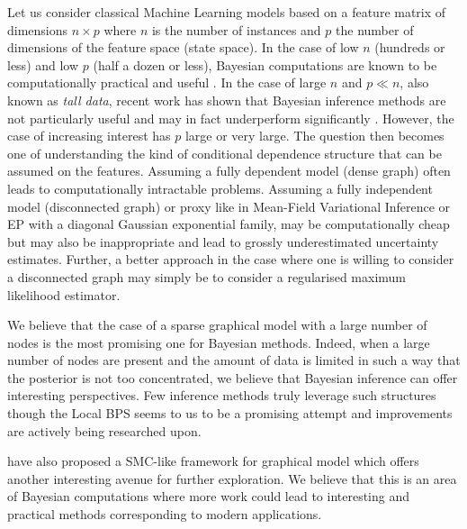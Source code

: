 Let us consider classical Machine Learning models based on a feature matrix of dimensions $n \times p$ where $n$ is the number of instances and $p$ the number of dimensions of the feature space (state space). In the case of low $n$ (hundreds or less) and low $p$ (half a dozen or less), Bayesian computations are known to be computationally practical and useful \citep{gelman13}. 
In the case of large $n$ and $p\ll n$, also known as \emph{tall data}, recent work has shown that Bayesian inference methods are not particularly useful and may in fact underperform significantly \citep{bardenet17, nagapetyan17}. 
However, the case of increasing interest has $p$ large or very large. 
The question then becomes one of understanding the kind of conditional dependence structure that can be assumed on the features. 
Assuming a fully dependent model (dense graph) often leads to computationally intractable problems. 
Assuming a fully independent model (disconnected graph) or proxy like in Mean-Field Variational Inference or EP with a diagonal Gaussian exponential family, may be computationally cheap but may also be inappropriate and lead to grossly underestimated uncertainty estimates.
Further, a better approach in the case where one is willing to consider a disconnected graph may simply be to consider a regularised maximum likelihood estimator.
 
We believe that the case of a sparse graphical model with a large number of nodes is the most promising one for Bayesian methods.
Indeed, when a large number of nodes are present and the amount of data is limited in such a way that the posterior is not too concentrated, we believe that Bayesian inference can offer interesting perspectives.
Few inference methods truly leverage such structures though the Local BPS seems to us to be a promising attempt and improvements are actively being researched upon. 

\citet{naesseth15} have also proposed a SMC-like framework for graphical model which offers another interesting avenue for further exploration.
We believe that this is an area of Bayesian computations where more work could lead to interesting and practical methods corresponding to modern applications.

